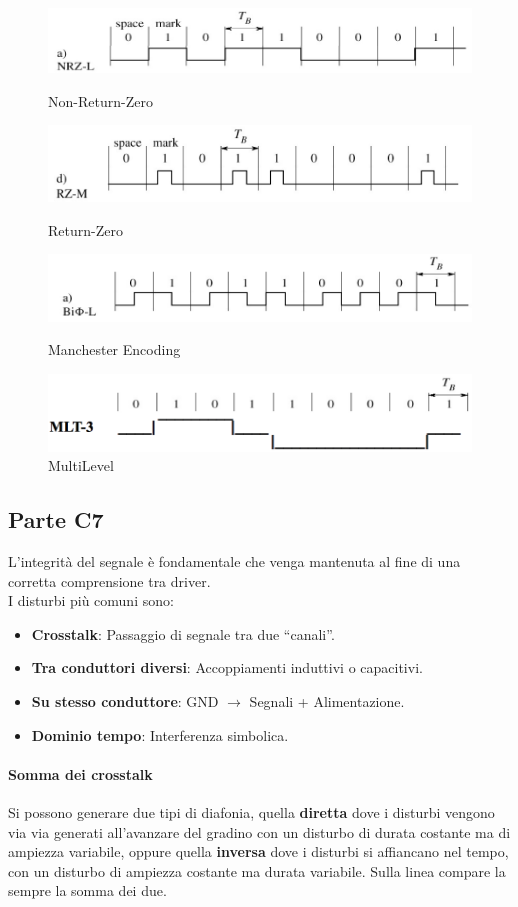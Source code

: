 \documentclass[12pt]{article}
\begin{document}
\begin{figure}[!hp]
  \includegraphics[width=\textwidth]{images/nrz.png}
  \caption{Non-Return-Zero}
  \label{fig:nrz}
  \includegraphics[width=\textwidth]{images/rz.png}
  \caption{Return-Zero}
  \label{fig:rz}
  \includegraphics[width=\textwidth]{images/manch.png}
  \caption{Manchester Encoding}
  \label{fig:manch}
  \includegraphics[width=\textwidth]{images/mlt.png}
  \caption{MultiLevel}
  \label{fig:mlt}
\end{figure}

\subsection{Parte C7}\label{c7}
L'integrità del segnale è fondamentale che venga mantenuta al fine di una corretta comprensione tra driver.\\
I disturbi più comuni sono:
\begin{itemize}
  \item \textbf{Crosstalk}: Passaggio di segnale tra due ``canali''.
  \item \textbf{Tra conduttori diversi}: Accoppiamenti induttivi o capacitivi.
  \item \textbf{Su stesso conduttore}: GND $\rightarrow$ Segnali + Alimentazione.
  \item \textbf{Dominio tempo}: Interferenza simbolica.
\end{itemize}
\paragraph{Somma dei crosstalk} Si possono generare due tipi di diafonia, quella \textbf{diretta} dove i disturbi vengono via via generati all'avanzare del gradino con un disturbo di durata costante ma di ampiezza variabile, oppure quella \textbf{inversa} dove i disturbi si affiancano nel tempo, con un disturbo di ampiezza costante ma durata variabile. Sulla linea compare la sempre la somma dei due.
\end{document}

